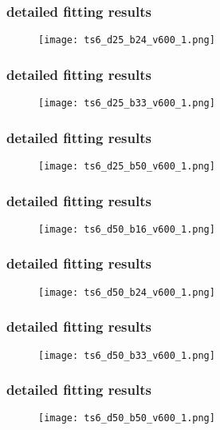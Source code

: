 	\begin{frame}
		\frametitle{\appendixname{} \textendash{} detailed fitting results}
		\begin{figure}
			\texttt{[image: ts6\_d25\_b24\_v600\_1.png]}
		\end{figure}
	\end{frame}

	\begin{frame}
		\frametitle{\appendixname{} \textendash{} detailed fitting results}
		\begin{figure}
			\texttt{[image: ts6\_d25\_b33\_v600\_1.png]}
		\end{figure}
	\end{frame}

	\begin{frame}
		\frametitle{\appendixname{} \textendash{} detailed fitting results}
		\begin{figure}
			\texttt{[image: ts6\_d25\_b50\_v600\_1.png]}
		\end{figure}
	\end{frame}

	\begin{frame}
		\frametitle{\appendixname{} \textendash{} detailed fitting results}
		\begin{figure}
			\texttt{[image: ts6\_d50\_b16\_v600\_1.png]}
		\end{figure}
	\end{frame}

	\begin{frame}
		\frametitle{\appendixname{} \textendash{} detailed fitting results}
		\begin{figure}
			\texttt{[image: ts6\_d50\_b24\_v600\_1.png]}
		\end{figure}
	\end{frame}

	\begin{frame}
		\frametitle{\appendixname{} \textendash{} detailed fitting results}
		\begin{figure}
			\texttt{[image: ts6\_d50\_b33\_v600\_1.png]}
		\end{figure}
	\end{frame}

	\begin{frame}
		\frametitle{\appendixname{} \textendash{} detailed fitting results}
		\begin{figure}
			\texttt{[image: ts6\_d50\_b50\_v600\_1.png]}
		\end{figure}
	\end{frame}


